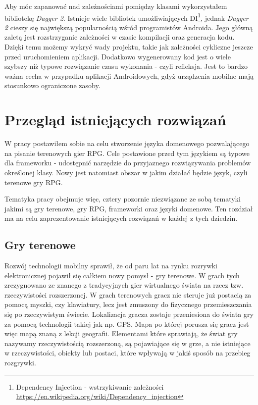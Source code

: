 \documentclass[openright]{xmgr}
\begin{document}
Aby móc zapanować nad zależnościami pomiędzy klasami wykorzystałem bibliotekę \textit{Dagger 2}.
Istnieje wiele bibliotek umożliwiających DI\footnote{Dependency Injection - wstrzykiwanie zależności \url{https://en.wikipedia.org/wiki/Dependency_injection}}, jednak \textit{Dagger 2} cieszy się największą popularnością wśród programistów Androida. Jego główną zaletą jest rozstrzyganie zależności w czasie kompilacji oraz generacja kodu. Dzięki temu możemy wykryć wady projektu, takie jak zależności cykliczne jeszcze przed uruchomieniem aplikacji. Dodatkowo wygenerowany kod jest o wiele szybszy niż typowe rozwiązanie czasu wykonania - czyli refleksja. Jest to bardzo ważna cecha w przypadku aplikacji Androidowych, gdyż urządzenia mobilne mają stosunkowo ograniczone zasoby. 

\chapter{Przegląd istniejących rozwiązań}

W pracy postawiłem sobie na celu stworzenie języka domenowego pozwalającego na pisanie terenowych gier RPG. Cele postawione przed tym językiem są typowe dla frameworku - udostępnić narzędzie do przyjaznego rozwiązywania problemów określonej klasy. Nowy jest natomiast obszar w jakim działać będzie język, czyli terenowe gry RPG.

Tematyka pracy obejmuje więc, cztery pozornie niezwiązane ze sobą tematyki jakimi są gry terenowe, gry RPG, frameworki oraz języki domenowe. Ten rozdział ma na celu zaprezentowanie istniejących rozwiązań w każdej z tych dziedzin.

\section{Gry terenowe}

Rozwój technologii mobilny sprawił, że od paru lat na rynku rozrywki elektronicznej pojawił się całkiem nowy pomysł - gry terenowe. W grach tych zrezygnowano ze znanego z tradycyjnych gier wirtualnego świata na rzecz tzw. rzeczywistości rozszerzonej. W grach terenowych gracz nie steruje już postacią za pomocą myszki, czy klawiatury, lecz jest zmuszony do fizycznego przemieszczania się po rzeczywistym świecie. Lokalizacja gracza zostaje przeniesiona do świata gry za pomocą technologii takiej jak np. GPS. Mapa po której porusza się gracz jest więc mapą znaną z lekcji geografii. Elementami które sprawiają, że świat gry nazywamy rzeczywistością rozszerzoną, są pojawiające się w grze, a nie istniejące w rzeczywistości, obiekty lub postaci, które wpływają w jakiś sposób na przebieg rozgrywki.
\end{document}
